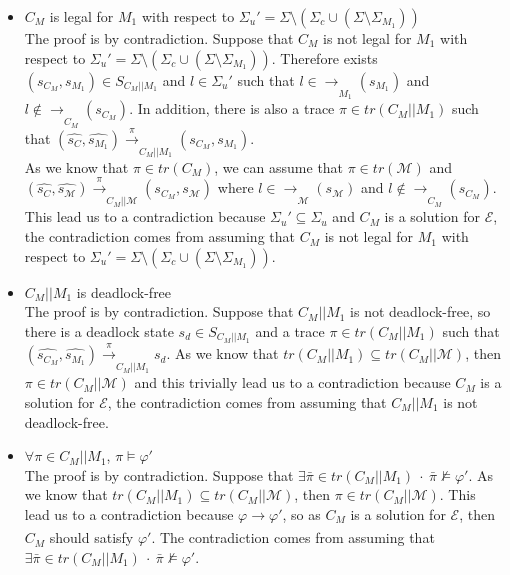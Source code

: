 \begin{itemize}
    \item $C_M$ is legal for $M_1$ with respect to $\Sigma_{u}' = \Sigma \setminus (\Sigma_c \cup (\Sigma \setminus \Sigma_{M_1}))$ \\
    The proof is by contradiction. Suppose that $C_M$ is not legal for $M_1$ with respect to $\Sigma_u' = \Sigma \setminus (\Sigma_c \cup (\Sigma \setminus \Sigma_{M_1}))$. Therefore exists $(s_{C_M}, s_{M_1}) \in S_{C_M||M_1}$ and $l \in \Sigma_u'$ such that $l \in \xrightarrow[]{}_{M_1}(s_{M_1})$ and $l \notin \xrightarrow[]{}_{C_M}(s_{C_M})$. In addition, there is also a trace $\pi \in tr(C_M || M_1)$ such that $(\hat{s_C}, \hat{s_{M_1}}) \xrightarrow[]{\pi}_{C_M||M_1} (s_{C_M},s_{M_1})$. \\
    As we know that $\pi \in tr(C_M)$, we can assume that $\pi \in tr(\mathcal{M})$ and $(\hat{s_C}, \hat{s_{\mathcal{M}}}) \xrightarrow[]{\pi}_{C_M||\mathcal{M}} (s_{C_M}, s_{\mathcal{M}})$ where $l \in \xrightarrow[]{}_{\mathcal{M}}(s_{\mathcal{M}})$ and $l \notin \xrightarrow[]{}_{C_M}(s_{C_M})$. This lead us to a contradiction because $\Sigma_u' \subseteq \Sigma_u$ and $C_M$ is a solution for $\mathcal{E}$, the contradiction comes from assuming that $C_M$ is not legal for $M_1$ with respect to $\Sigma_u' = \Sigma \setminus (\Sigma_c \cup (\Sigma \setminus \Sigma_{M_1}))$. \\
    
    \item $C_M || M_1$ is deadlock-free \\
    The proof is by contradiction. Suppose that $C_M||M_1$ is not deadlock-free, so there is a deadlock state $s_d \in S_{C_M||M_1}$ and a trace $\pi \in tr(C_M||M_1)$ such that $(\hat{s_{C_M}}, \hat{s_{M_1}}) \xrightarrow[]{\pi}_{C_M||M_1} s_d$. As we know that $tr(C_M||M_1) \subseteq tr(C_M||\mathcal{M})$, then $\pi \in tr(C_M||\mathcal{M})$ and this trivially lead us to a contradiction because $C_M$ is a solution for $\mathcal{E}$, the contradiction comes from assuming that $C_M ||M_1$ is not deadlock-free. \\
    
    \item $\forall \pi \in C_M || M_1$, $\pi \vDash \varphi'$ \\
    The proof is by contradiction. Suppose that $\exists \bar{\pi} \in tr(C_M||M_1) \ \cdot \ \bar{\pi} \nvDash \varphi'$. As we know that $tr(C_M||M_1) \subseteq tr(C_M||\mathcal{M})$, then $\pi \in tr(C_M || \mathcal{M})$. This lead us to a contradiction because $\varphi \xrightarrow[]{} \varphi'$, so as $C_M$ is a solution for $\mathcal{E}$, then $C_M$ should satisfy $\varphi'$. The contradiction comes from assuming that $\exists \bar{\pi} \in tr(C_M||M_1) \ \cdot \ \bar{\pi} \nvDash \varphi'$. 
    
    
\end{itemize}

